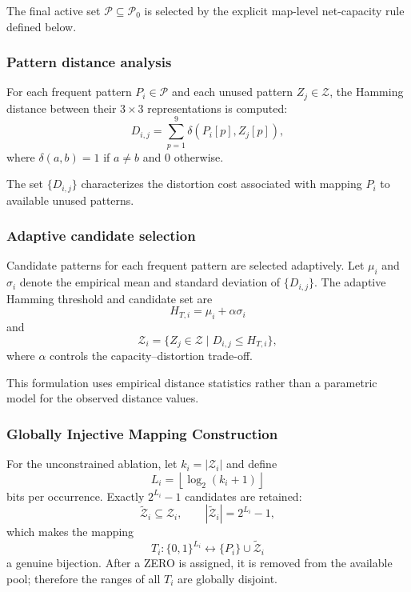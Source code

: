 \documentclass[a4paper,fleqn]{cas-dc}
\begin{document}
The final active set $\mathcal{P}\subseteq\mathcal{P}_0$ is selected by the
explicit map-level net-capacity rule defined below.

\subsubsection*{Pattern distance analysis}

For each frequent pattern $P_i \in \mathcal{P}$ and each unused pattern $Z_j \in \mathcal{Z}$,
the Hamming distance between their $3 \times 3$ representations is computed:
\begin{equation}
D_{i,j} = \sum_{p=1}^{9} \delta(P_i[p], Z_j[p]),
\label{eq:hamming-distance}
\end{equation}
where $\delta(a,b)=1$ if $a\neq b$ and $0$ otherwise.

The set $\{D_{i,j}\}$ characterizes the distortion cost associated with mapping $P_i$ to available unused patterns.

\subsubsection*{Adaptive candidate selection}

Candidate patterns for each frequent pattern are selected adaptively.
Let $\mu_i$ and $\sigma_i$ denote the empirical mean and standard deviation of $\{D_{i,j}\}$.
The adaptive Hamming threshold and candidate set are
\begin{equation}
H_{T,i}=\mu_i+\alpha\sigma_i
\label{eq:adaptive-threshold}
\end{equation}
and
\begin{equation}
\mathcal{Z}_i = \{ Z_j \in \mathcal{Z} \mid D_{i,j} \le H_{T,i} \},
\label{eq:adaptive-candidate-set}
\end{equation}
where $\alpha$ controls the capacity--distortion trade-off.

This formulation uses empirical distance statistics rather than a parametric
model for the observed distance values.

\subsubsection{Globally Injective Mapping Construction}

For the unconstrained ablation, let $k_i=|\mathcal{Z}_i|$ and define
\begin{equation}
L_i = \left\lfloor \log_2 (k_i + 1) \right\rfloor
\label{eq:bits-per-occurrence}
\end{equation}
bits per occurrence. Exactly $2^{L_i}-1$ candidates are retained:
\begin{equation}
\widetilde{\mathcal Z}_i\subseteq\mathcal Z_i,\qquad
|\widetilde{\mathcal Z}_i|=2^{L_i}-1,
\label{eq:retained-zero-set}
\end{equation}
which makes the mapping
\begin{equation}
T_i:\{0,1\}^{L_i}\longleftrightarrow
\{P_i\}\cup\widetilde{\mathcal Z}_i
\label{eq:local-bijection}
\end{equation}
a genuine bijection. After a ZERO is assigned, it is removed from the
available pool; therefore the ranges of all $T_i$ are globally disjoint.
\end{document}
